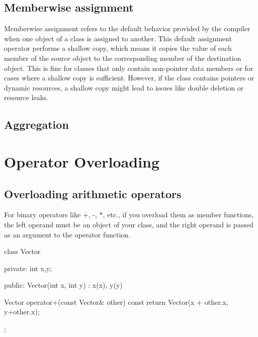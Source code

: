 \documentclass{report}
\begin{document}
    \bigbreak \noindent 
    \subsection{Memberwise assignment}
    \bigbreak \noindent 
    \begin{concept}
        Memberwise assignment refers to the default behavior provided by the compiler when one object of a class is assigned to another. This default assignment operator performs a shallow copy, which means it copies the value of each member of the source object to the corresponding member of the destination object. This is fine for classes that only contain non-pointer data members or for cases where a shallow copy is sufficient. However, if the class contains pointers or dynamic resources, a shallow copy might lead to issues like double deletion or resource leaks.
    \end{concept}


    \bigbreak \noindent 
    \subsection{Aggregation}
    \bigbreak \noindent 

    \pagebreak \bigbreak \noindent 
    \section{Operator Overloading}
    \bigbreak \noindent 
    \subsection{Overloading arithmetic operators}
    \bigbreak \noindent 
    For binary operators like +, -, *, etc., if you overload them as member functions, the left operand must be an object of your class, and the right operand is passed as an argument to the operator function.
    \bigbreak \noindent 
    \begin{cppcode}
class Vector {
    private:
        int x,y;

    public:
        Vector(int x, int y) : x(x), y(y) {}

        Vector operator+(const Vector& other) const {
            return Vector(x + other.x, y+other.x);
        }
};
    \end{cppcode}
    \bigbreak \noindent 

    \bigbreak \noindent 
\end{document}
